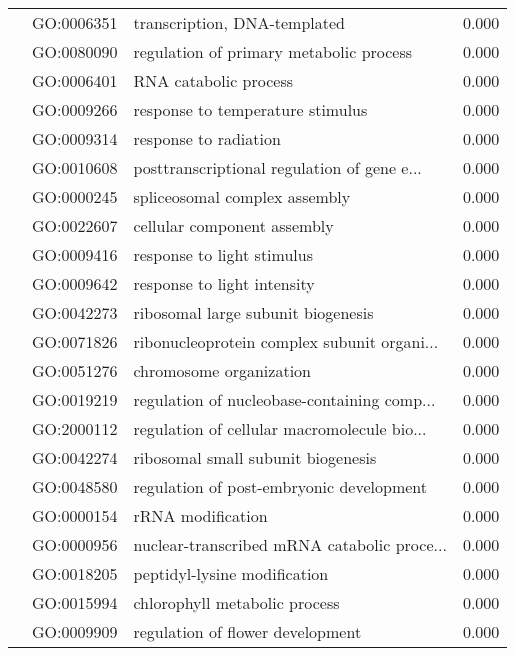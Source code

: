 \begin{longtable}{lllr}
   & GO:0006351 &                 transcription, DNA-templated &         0.000 \\
   & GO:0080090 &      regulation of primary metabolic process &         0.000 \\
   & GO:0006401 &                        RNA catabolic process &         0.000 \\
   & GO:0009266 &             response to temperature stimulus &         0.000 \\
   & GO:0009314 &                        response to radiation &         0.000 \\
   & GO:0010608 &  posttranscriptional regulation of gene e... &         0.000 \\
   & GO:0000245 &                spliceosomal complex assembly &         0.000 \\
   & GO:0022607 &                  cellular component assembly &         0.000 \\
   & GO:0009416 &                   response to light stimulus &         0.000 \\
   & GO:0009642 &                  response to light intensity &         0.000 \\
   & GO:0042273 &           ribosomal large subunit biogenesis &         0.000 \\
   & GO:0071826 &  ribonucleoprotein complex subunit organi... &         0.000 \\
   & GO:0051276 &                      chromosome organization &         0.000 \\
   & GO:0019219 &  regulation of nucleobase-containing comp... &         0.000 \\
   & GO:2000112 &  regulation of cellular macromolecule bio... &         0.000 \\
   & GO:0042274 &           ribosomal small subunit biogenesis &         0.000 \\
   & GO:0048580 &     regulation of post-embryonic development &         0.000 \\
   & GO:0000154 &                            rRNA modification &         0.000 \\
   & GO:0000956 &  nuclear-transcribed mRNA catabolic proce... &         0.000 \\
   & GO:0018205 &                 peptidyl-lysine modification &         0.000 \\
   & GO:0015994 &                chlorophyll metabolic process &         0.000 \\
   & GO:0009909 &             regulation of flower development &         0.000 \\

\end{longtable}
